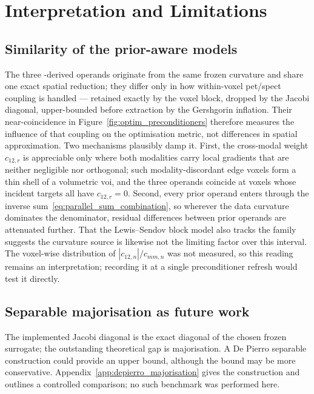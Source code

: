 \section{Interpretation and Limitations}

\subsection{Similarity of the prior-aware models}
\label{subsubsec:prior_model_similarity}

The three -derived operands originate from the same frozen curvature and share one exact spatial reduction; they differ only in how within-voxel \gls{pet}/\gls{spect} coupling is handled --- retained exactly by the voxel block, dropped by the Jacobi diagonal, upper-bounded before extraction by the Gershgorin inflation. Their near-coincidence in Figure~\ref{fig:optim_preconditioners} therefore measures the influence of that coupling on the optimisation metric, not differences in spatial approximation. Two mechanisms plausibly damp it. First, the cross-modal weight $c_{12,r}$ is appreciable only where both modalities carry local gradients that are neither negligible nor orthogonal; such modality-discordant edge voxels form a thin shell of a volumetric \gls{voi}, and the three operands coincide at voxels whose incident targets all have $c_{12,r}=0$. Second, every prior operand enters through the inverse sum~\eqref{eq:parallel_sum_combination}, so wherever the data curvature dominates the denominator, residual differences between prior operands are attenuated further. That the Lewis--Sendov block model also tracks the  family suggests the curvature source is likewise not the limiting factor over this interval. The voxel-wise distribution of $|c_{12,n}|/c_{mm,n}$ was not measured, so this reading remains an interpretation; recording it at a single preconditioner refresh would test it directly.

\subsection{Separable majorisation as future work}

The implemented Jacobi diagonal is the exact diagonal of the chosen frozen surrogate; the outstanding theoretical gap is majorisation. A De Pierro separable construction could provide an upper bound, although the bound may be more conservative. Appendix~\ref{app:depierro_majorisation} gives the construction and outlines a controlled comparison; no such benchmark was performed here.

